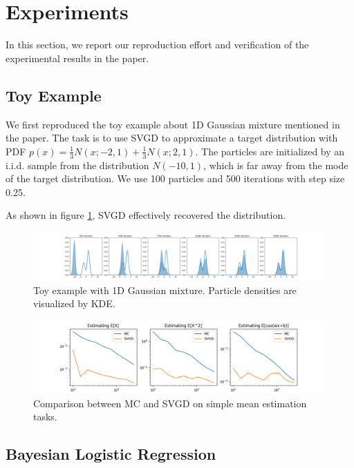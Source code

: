 \section{Experiments}
In this section, we report our reproduction effort and verification of the experimental results in the paper.

\subsection{Toy Example}

We first reproduced the toy example about 1D Gaussian mixture mentioned in the paper. The task is to use SVGD to approximate a target distribution with PDF $p(x) = \frac{1}{3} N(x; -2, 1) + \frac{1}{3} N(x; 2, 1)$. The particles are initialized by an i.i.d. sample from the distribution $N(-10, 1)$, which is far away from the mode of the target distribution. We use 100 particles and 500 iterations with step size 0.25. 

As shown in figure \ref{fig:toy1dgaussian-1}, SVGD effectively recovered the distribution.

\begin{figure}[h]
    \centering
    \includegraphics[width=\textwidth]{original-code/Toy-Examples/mixture1d_all.png}
    \caption{Toy example with 1D Gaussian mixture. Particle densities are visualized by KDE.}
    \label{fig:toy1dgaussian-1}
\end{figure}

\begin{figure}[h]
    \centering
    \includegraphics[width=\textwidth]{figs/toy-figure2.png}
    \caption{Comparison between MC and SVGD on simple mean estimation tasks. }
    \label{fig:my_label}
\end{figure}

\subsection{Bayesian Logistic Regression}

